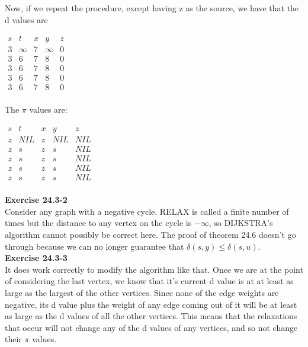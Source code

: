 \documentclass{article}
\begin{document}
Now, if we repeat the procedure, except having z as the source, we have that the d values are


\begin{center}
$
\begin{array}{|c|c|c|c|c|c|}
s&t&x&y&z\\
\hline
3&\infty&7&\infty&0\\
3&6&7&8&0\\
3&6&7&8&0\\
3&6&7&8&0\\
3&6&7&8&0\\
\end{array}
$
\end{center}


The $\pi$ values are:

\begin{center}
$
\begin{array}{|c|c|c|c|c|c|}
s&t&x&y&z\\
\hline
z&NIL&z&NIL&NIL\\
z&s&z&s&NIL\\
z&s&z&s&NIL\\
z&s&z&s&NIL\\
z&s&z&s&NIL\\
\end{array}
$
\end{center}

\noindent\textbf{Exercise 24.3-2}\\

Consider any graph with a negative cycle. RELAX is called a finite number of times but the distance to any vertex on the cycle is $-\infty$, so DIJKSTRA's algorithm cannot possibly be correct here.  The proof of theorem 24.6 doesn't go through because we can no longer guarantee that $\delta(s,y) \leq \delta(s,u)$.\\

\noindent\textbf{Exercise 24.3-3}\\

It does work correctly to modify the algorithm like that. Once we are at the point of considering the last vertex, we know that it's current d value is at at least as large as the largest of the other vertices. Since none of the edge weights are negative, its d value plus the weight of any edge coming out of it will be at least as large as the d values of all the other vertices. This means that the relaxations that occur will not change any of the d values of any vertices, and so not change their $\pi$ values.\\
\end{document}
